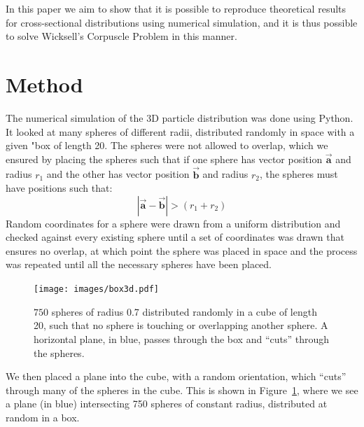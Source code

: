 \documentclass[journal]{IEEEtran}
\begin{document}
In this paper we aim to show that it is possible to reproduce theoretical
results for cross-sectional distributions using numerical simulation, and it is
thus possible to solve Wicksell's Corpuscle Problem in this manner.


\section{Method}

The numerical simulation of the 3D particle distribution was done using
Python. It looked at many spheres of different radii, distributed randomly in
space with a given "box of length 20. The spheres were not allowed to overlap,
which we ensured by placing the spheres such that if one sphere has vector
position $\overrightarrow{\textbf{a}}$ and radius $r_{1}$ and the other has
vector position $\overrightarrow{\textbf{b}}$ and radius $r_{2}$, the spheres
must have positions such that:
\begin{equation*}
|\overrightarrow{\textbf{a}} - \overrightarrow{\textbf{b}}| > (r_{1} + r_{2})
\end{equation*}
Random coordinates for a sphere were drawn from a uniform distribution and
checked against every existing sphere until a set of coordinates was drawn that
ensures no overlap, at which point the sphere was placed in space and the process
was repeated until all the necessary spheres have been placed.

\begin{figure}%
\begin{center}
\texttt{[image: images/box3d.pdf]}
\caption{$750$ spheres of radius 0.7 distributed randomly in a cube of length 20,
  such that no sphere is touching or overlapping another sphere. A horizontal
  plane, in blue, passes through the box and ``cuts'' through the
  spheres.}\label{fig:3dplot_plane}
\end{center}
\end{figure}

We then placed a plane into the cube, with a random orientation, which
``cuts'' through many of the spheres in the cube. This is shown in
Figure~\ref{fig:3dplot_plane}, where we see a plane (in blue) intersecting 750
spheres of constant radius, distributed at random in a box.
\end{document}
